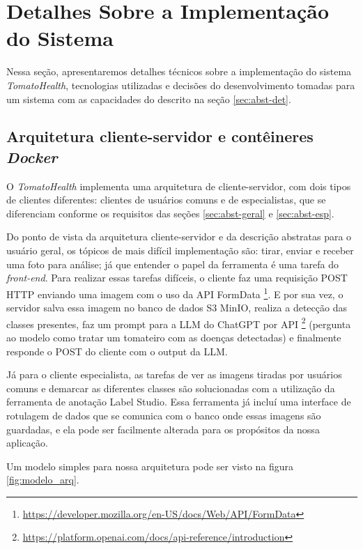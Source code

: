 \section{{Detalhes Sobre a Implementação do Sistema}} \label{sec:implementacao_sistema}

Nessa seção, apresentaremos detalhes técnicos sobre a implementação do sistema \textit{TomatoHealth}, tecnologias utilizadas e decisões do desenvolvimento tomadas para um sistema com as capacidades do descrito na seção \ref{sec:abst-det}.

\subsection{Arquitetura cliente-servidor e contêineres \emph{Docker}}

O \emph{TomatoHealth} implementa uma arquitetura de cliente-servidor, com dois tipos de clientes diferentes: clientes de usuários comuns e de especialistas, que se diferenciam conforme os requisitos das seções \ref{sec:abst-geral} e \ref{sec:abst-esp}.

Do ponto de vista da arquitetura cliente-servidor e da descrição abstratas para o usuário geral, os tópicos de mais difícil implementação são: tirar, enviar e receber uma foto para análise; já que entender o papel da ferramenta é uma tarefa do \emph{front-end}. Para realizar essas tarefas difíceis, o cliente faz uma requisição POST HTTP enviando uma imagem com o uso da API FormData \footnote{\url{https://developer.mozilla.org/en-US/docs/Web/API/FormData}}. E por sua vez, o servidor salva essa imagem no banco de dados S3 MinIO, realiza a detecção das classes presentes, faz um prompt para a LLM do ChatGPT por API \footnote{\url{https://platform.openai.com/docs/api-reference/introduction}} (pergunta ao modelo como tratar um tomateiro com as doenças detectadas) e finalmente responde o POST do cliente com o output da LLM.

Já para o cliente especialista, as tarefas de ver as imagens tiradas por usuários comuns e demarcar as diferentes classes são solucionadas com a utilização da ferramenta de anotação Label Studio. Essa ferramenta já incluí uma interface de rotulagem de dados que se comunica com o banco onde essas imagens são guardadas, e ela pode ser facilmente alterada para os propósitos da nossa aplicação.

Um modelo simples para nossa arquitetura pode ser visto na figura \ref{fig:modelo_arq}.

